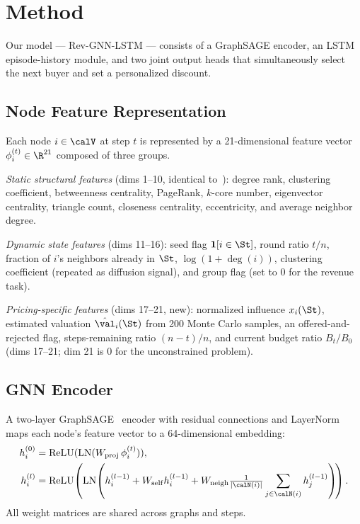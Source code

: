 
\section{Method}
\label{sec:method}

Our model — Rev-GNN-LSTM — consists of a GraphSAGE encoder,
an LSTM episode-history module, and two joint output heads that simultaneously
select the next buyer and set a personalized discount.

\subsection{Node Feature Representation}
\label{sec:features}

Each node $i \in \calV$ at step $t$ is represented by a 21-dimensional feature vector
$\phi_i^{(t)} \in \R^{21}$ composed of three groups.

\emph{Static structural features} (dims 1–10, identical to~\citet{anon_wsdm27}):
degree rank, clustering coefficient, betweenness centrality, PageRank,
$k$-core number, eigenvector centrality, triangle count, closeness centrality,
eccentricity, and average neighbor degree.

\emph{Dynamic state features} (dims 11–16):
seed flag $\mathbf{1}[i \in \St]$, round ratio $t/n$,
fraction of $i$'s neighbors already in $\St$,
$\log(1 + \deg(i))$, clustering coefficient (repeated as diffusion signal),
and group flag (set to 0 for the revenue task).

\emph{Pricing-specific features} (dims 17–21, new):
normalized influence $x_i(\St)$,
estimated valuation $\hat{\val}_i(\St)$ from 200 Monte Carlo samples,
an offered-and-rejected flag,
steps-remaining ratio $(n - t)/n$,
and current budget ratio $B_t / B_0$ (dims 17–21; dim 21 is $0$ for the
unconstrained problem).

\subsection{GNN Encoder}
\label{sec:gnn}

A two-layer GraphSAGE~\citep{hamilton2017inductive} encoder with residual
connections and LayerNorm maps each node's feature vector to a 64-dimensional
embedding:
\begin{align}
  h_i^{(0)} &= \mathrm{ReLU}(\mathrm{LN}(W_{\mathrm{proj}}\,\phi_i^{(t)})),\\
  h_i^{(l)} &= \mathrm{ReLU}\!\left(\mathrm{LN}\!\left(h_i^{(l-1)}
    + W_{\mathrm{self}} h_i^{(l-1)}
    + W_{\mathrm{neigh}} \tfrac{1}{|\calN(i)|}\sum_{j\in\calN(i)} h_j^{(l-1)}
  \right)\!\right).
\end{align}
All weight matrices are shared across graphs and steps.

